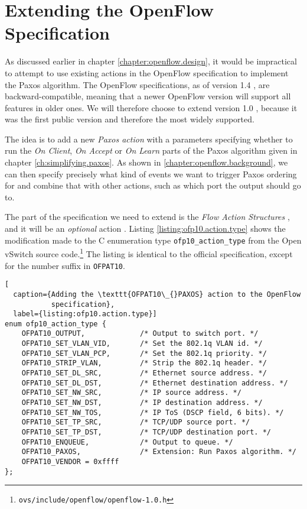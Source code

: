\section{Extending the OpenFlow Specification}

As discussed earlier in chapter \ref{chapter:openflow.design}, it would be
impractical to attempt to use existing actions in the OpenFlow specification
to implement the Paxos algorithm.
%
The OpenFlow specifications, as of version 1.4 \cite{openflow-1.4}, are
backward-compatible, meaning that a newer OpenFlow version will support all
features in older ones.  We will therefore choose to extend version 1.0
\cite{openflow-1.0}, because it was the first public version and therefore
the most widely supported.

The idea is to add a new \textit{Paxos action} with a parameters 
specifying whether to run the \textit{On Client}, \textit{On Accept} or 
\textit{On Learn} parts of the Paxos algorithm given in chapter
\vref{ch:simplifying.paxos}.
%
As shown in \vref{chapter:openflow.background}, we can then specify
precisely what kind of events we want to trigger Paxos ordering for and
combine that with other actions, such as which port the output should go to.

The part of the specification we need to extend is the 
\textit{Flow Action Structures} \cite[pp.~21--22]{openflow-1.0},
and it will be an \textit{optional} action \cite[pp.~3--6]{openflow-1.0}.
%
Listing \ref{listing:ofp10.action.type} shows the modification made to
the C enumeration type \texttt{ofp10\_{}action\_{}type} from the
Open vSwitch source
code.\footnote{\texttt{ovs/include/openflow/openflow-1.0.h}}
%
The listing is identical to the official specification, except for the
number suffix in \texttt{OFPAT10}.

\begin{lstlisting}[
  caption={Adding the \texttt{OFPAT10\_{}PAXOS} action to the OpenFlow
           specification},
  label={listing:ofp10.action.type}]
enum ofp10_action_type {
    OFPAT10_OUTPUT,             /* Output to switch port. */
    OFPAT10_SET_VLAN_VID,       /* Set the 802.1q VLAN id. */
    OFPAT10_SET_VLAN_PCP,       /* Set the 802.1q priority. */
    OFPAT10_STRIP_VLAN,         /* Strip the 802.1q header. */
    OFPAT10_SET_DL_SRC,         /* Ethernet source address. */
    OFPAT10_SET_DL_DST,         /* Ethernet destination address. */
    OFPAT10_SET_NW_SRC,         /* IP source address. */
    OFPAT10_SET_NW_DST,         /* IP destination address. */
    OFPAT10_SET_NW_TOS,         /* IP ToS (DSCP field, 6 bits). */
    OFPAT10_SET_TP_SRC,         /* TCP/UDP source port. */
    OFPAT10_SET_TP_DST,         /* TCP/UDP destination port. */
    OFPAT10_ENQUEUE,            /* Output to queue. */
    OFPAT10_PAXOS,              /* Extension: Run Paxos algorithm. */
    OFPAT10_VENDOR = 0xffff
};
\end{lstlisting}

